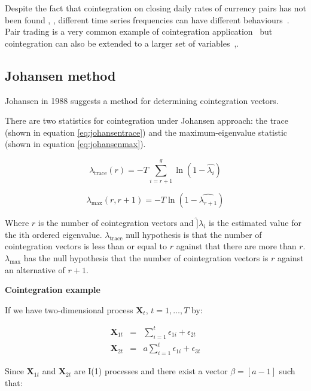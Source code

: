 Despite the fact that cointegration on closing daily rates of currency pairs has
not been found \cite{coleman1990}, \cite{copeland1991}, different time series
frequencies can have different behaviours~\cite{aldridge2009}. Pair trading is a
very common example of cointegration application~\cite{herlemont2003} but
cointegration can also be extended to a larger set of
variables~\cite{mukherjee1995},\cite{engle2004}.

\subsection{Johansen method}
Johansen in 1988 \cite{johansen1988} suggests a method for determining cointegration vectors. 

There are two statistics for cointegration under Johansen approach: the trace (shown in equation \ref{eq:johansentrace}) and the maximum-eigenvalue statistic (shown in equation \ref{eq:johansenmax}).

\begin{equation}
\label{eq:johansentrace}
\lambda_{\text{trace}} (r) = -T \sum_{i=r+1}^g \ln(1-\hat{\lambda_i})
\end{equation}


\begin{equation}
\label{eq:johansenmax}
\lambda_{\text{max}} (r,r+1) = -T \ln(1-\hat{\lambda_{r+1}})
\end{equation}


Where $r$ is the number of cointegration vectors and $\hat]{\lambda}_i$ is the estimated value for the ith ordered eigenvalue.  $\lambda_{\text{trace}}$ null hypothesis is that the number of cointegration vectors is less than or equal to $r$ against that there are more than $r$. $\lambda_{\text{max}}$ has the null hypothesis that the number of cointegration vectors is $r$ against an alternative of $r
+1$.


\newpage
\textbf{Cointegration example} \quad

If we have two-dimensional process $\mathbf{X}_t$, $t=1,\dots,T$ by:

\begin{eqnarray*}
\mathbf{X}_{1t} &=& \sum_{i=1}^t \epsilon_{1i} + \epsilon_{2t} \\
\mathbf{X}_{2t} &=& a \sum_{i=1}^t \epsilon_{1i} + \epsilon_{3t} 
\end{eqnarray*}

Since $\mathbf{X}_{1t}$ and $\mathbf{X}_{2t}$ are I(1) processes and there
exist a vector $\beta = [a -1]$ such that:

